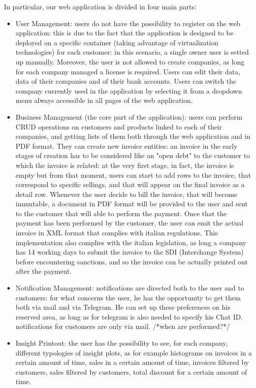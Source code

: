 In particular, our web application is divided in four main parts:
\begin{itemize}
    \item User Management: users do not have the possibility to register on the web application: this is due to the fact that the application is designed to be deployed on a specific container (taking advantage of virtualization technologies) for each customer: in this scenario, a single owner user is setted up manually. Moreover, the user is not allowed to create companies, as long for each company managed a license is required. Users can edit their data, data of their companies and of their bank accounts. Users can switch the company currently used in the application by selecting it from a dropdown menu always accessible in all pages of the web application.
    \item Business Management (the core part of the application): users can perform CRUD operations on customers and products linked to each of their companies, and getting lists of them both through the web application and in PDF format. They can create new invoice entities: an invoice in the early stages of creation has to be considered like an "open debt" to the customer to which the invoice is related: at the very first stage, in fact, the invoice is empty but from that moment, users can start to add rows to the invoice, that correspond to specific sellings, and that will appear on the final invoice as a detail row. Whenever the user decide to bill the invoice, that will become immutable, a document in PDF format will be provided to the user and sent to the customer that will able to perform the payment. Once that the payment has been performed by the customer, the user can emit the actual invoice in XML format that complies with italian regulations. This implementation also complies with the italian legislation, as long a company has 14 working days to submit the invoice to the SDI (Interchange System) before encountering sanctions, and so the invoice can be actually printed out after the payment.
    \item Notification Management: notifications are directed both to the user and to customers: for what concerns the user, he has the opportunity to get them both via mail and via Telegram. He can set up these preferences on his reserved area, as long as for telegram is also needed to specify his Chat ID. notifications for customers are only via mail. /*when are performed?*/
    \item Insight Printout: the user has the possibility to see, for each company, different typologies of insight plots, as for example histograms on invoices in a certain amount of time, sales in a certain amount of time, invoices filtered by customers, sales filtered by customers, total discount for a certain amount of time.
\end{itemize}
